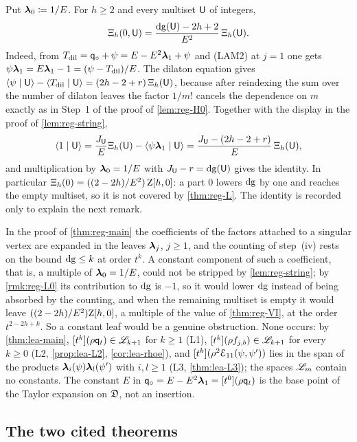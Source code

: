 \begin{rmk}
\label{rmk:reg-L0}
Put $\boldsymbol{\lambda}_0\coloneqq 1/E$. For $h\geq 2$ and every multiset $\mathsf{U}$ of integers,
\[
\Xi_h(0,\mathsf{U})=\frac{\mathrm{dg}(\mathsf{U})-2h+2}{E^2}\,\Xi_h(\mathsf{U}).
\]
Indeed, from $T_{\mathrm{dil}}=\mathsf{q}_{\circ}+\psi=E-E^2\boldsymbol{\lambda}_1+\psi$ and (LAM2) at $j=1$ one gets $\psi\boldsymbol{\lambda}_1=E\boldsymbol{\lambda}_1-1=(\psi-T_{\mathrm{dil}})/E$. The dilaton equation gives $\langle \psi\mid \mathsf{U}\rangle-\langle T_{\mathrm{dil}}\mid \mathsf{U}\rangle=(2h-2+r)\,\Xi_h(\mathsf{U})$, because after reindexing the sum over the number of dilaton leaves the factor $1/m!$ cancels the dependence on $m$ exactly as in Step~1 of the proof of \cref{lem:reg-H0}. Together with the display in the proof of \cref{lem:reg-string},
\[
\langle 1\mid \mathsf{U}\rangle=\frac{J_{\mathsf{U}}}{E}\Xi_h(\mathsf{U})-\langle \psi\boldsymbol{\lambda}_1\mid \mathsf{U}\rangle=\frac{J_{\mathsf{U}}-(2h-2+r)}{E}\,\Xi_h(\mathsf{U}),
\]
and multiplication by $\boldsymbol{\lambda}_0=1/E$ with $J_{\mathsf{U}}-r=\mathrm{dg}(\mathsf{U})$ gives the identity. In particular $\Xi_h(0)=((2-2h)/E^2)\,\mathrm{Z}[h,0]$: a part $0$ lowers $\mathrm{dg}$ by one and reaches the empty multiset, so it is not covered by \cref{thm:reg-L}. The identity is recorded only to explain the next remark.
\end{rmk}

\begin{rmk}
\label{rmk:reg-nol0}
In the proof of \cref{thm:reg-main} the coefficients of the factors attached to a singular vertex are expanded in the leaves $\boldsymbol{\lambda}_j$, $j\geq 1$, and the counting of step~(iv) rests on the bound $\mathrm{dg}\leq k$ at order $t^k$. A constant component of such a coefficient, that is, a multiple of $\boldsymbol{\lambda}_0=1/E$, could not be stripped by \cref{lem:reg-string}; by \cref{rmk:reg-L0} its contribution to $\mathrm{dg}$ is $-1$, so it would lower $\mathrm{dg}$ instead of being absorbed by the counting, and when the remaining multiset is empty it would leave $((2-2h)/E^2)\mathrm{Z}[h,0]$, a multiple of the value of \cref{thm:reg-VI}, at the order $t^{2-2h+k}$. So a constant leaf would be a genuine obstruction. None occurs: by \cref{thm:lea-main}, $[t^k](\rho\mathsf{q}_{t})\in\mathscr{L}_{k+1}$ for $k\geq 1$ (L1), $[t^k](\rho f_{j,b})\in\mathscr{L}_{k+1}$ for every $k\geq 0$ (L2, \cref{prop:lea-L2}, \cref{cor:lea-rhoe}), and $[t^k](\rho^2\mathcal{E}_{11}(\psi,\psi'))$ lies in the span of the products $\boldsymbol{\lambda}_i(\psi)\boldsymbol{\lambda}_l(\psi')$ with $i,l\geq 1$ (L3, \cref{thm:lea-L3}); the spaces $\mathscr{L}_m$ contain no constants. The constant $E$ in $\mathsf{q}_{\circ}=E-E^2\boldsymbol{\lambda}_1=[t^0](\rho\mathsf{q}_{t})$ is the base point of the Taylor expansion on $\mathfrak{D}$, not an insertion.
\end{rmk}

\subsection{The two cited theorems}
\label{sec:reg-cited}

